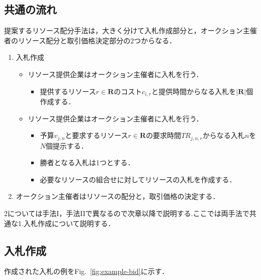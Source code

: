\hypertarget{ux5171ux901aux306eux6d41ux308c}{%
\subsection{共通の流れ}\label{ux5171ux901aux306eux6d41ux308c}}

提案するリソース配分手法は，大きく分けて入札作成部分と，オークション主催者のリソース配分と取引価格決定部分の2つからなる．

\begin{enumerate}
\def\labelenumi{\arabic{enumi}.}
\tightlist
\item
  入札作成

  \begin{itemize}
  \tightlist
  \item
    リソース提供企業はオークション主催者に入札を行う．

    \begin{itemize}
    \tightlist
    \item
      提供するリソース\(r \in \boldsymbol{R}\)のコスト\(c_{i,r}\)と提供時間からなる入札を\(|\boldsymbol{R}|\)個作成する．
    \end{itemize}
  \item
    リソース提供企業はオークション主催者に入札を行う．

    \begin{itemize}
    \tightlist
    \item
      予算\(v_{j,n}\)と要求するリソース\(r \in \boldsymbol{R}\)の要求時間\(TR_{j,n,r}\)からなる入札\(n\)を\(N\)個提示する．
    \item
      勝者となる入札は1つとする．
    \item
      必要なリソースの組合せに対してリソースの入札を作成する．
    \end{itemize}
  \end{itemize}
\item
  オークション主催者はリソースの配分と，取引価格の決定する．
\end{enumerate}

2については手法I，手法IIで異なるので次章以降で説明する.ここでは両手法で共通な1.入札作成について説明する．

\hypertarget{ux5165ux672dux4f5cux6210}{%
\subsection{\texorpdfstring{入札作成\label{make-bid}}{入札作成}}\label{ux5165ux672dux4f5cux6210}}

作成された入札の例をFig.~\ref{fig:example-bid}に示す．

